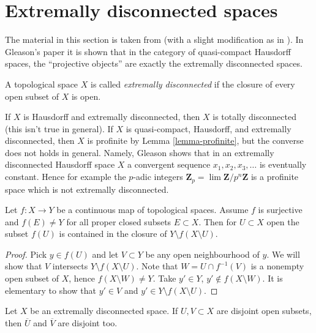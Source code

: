 \section{Extremally disconnected spaces}
\label{section-extremally-disconnected}

\noindent
The material in this section is taken from \cite{Gleason}
(with a slight modification as in \cite{Rainwater}).
In Gleason's paper it is shown that in the category of quasi-compact
Hausdorff spaces, the ``projective objects'' are exactly the extremally
disconnected spaces.

\begin{definition}
\label{definition-extremally-disconnected}
A topological space $X$ is called {\it extremally disconnected}
if the closure of every open subset of $X$ is open.
\end{definition}

\noindent
If $X$ is Hausdorff and extremally disconnected, then $X$ is totally
disconnected (this isn't true in general). If $X$ is quasi-compact,
Hausdorff, and extremally disconnected, then $X$ is profinite by
Lemma \ref{lemma-profinite}, but the converse does not holds in general.
Namely, Gleason shows that in an extremally disconnected Hausdorff space $X$
a convergent sequence $x_1, x_2, x_3, \ldots$ is eventually constant.
Hence for example the $p$-adic integers
$\mathbf{Z}_p = \lim \mathbf{Z}/p^n\mathbf{Z}$ is a profinite space
which is not extremally disconnected.

\begin{lemma}
\label{lemma-image-open-technical}
Let $f : X \to Y$ be a continuous map of topological spaces.
Assume $f$ is surjective and $f(E) \not = Y$ for all proper
closed subsets $E \subset X$. Then for $U \subset X$ open the subset
$f(U)$ is contained in the closure of $Y \setminus f(X \setminus U)$.
\end{lemma}

\begin{proof}
Pick $y \in f(U)$ and let $V \subset Y$ be any open neighbourhood of $y$.
We will show that $V$ intersects $Y \setminus f(X \setminus U)$.
Note that $W = U \cap f^{-1}(V)$ is a nonempty open subset of $X$, hence
$f(X \setminus W) \not = Y$. Take $y' \in Y$, $y' \not \in f(X \setminus W)$.
It is elementary to show that $y' \in V$ and
$y' \in Y \setminus f(X \setminus U)$.
\end{proof}

\begin{lemma}
\label{lemma-intersection-empty}
Let $X$ be an extremally disconnected space.
If $U, V \subset X$ are disjoint open subsets, then
$\overline{U}$ and $\overline{V}$ are disjoint too.
\end{lemma}

